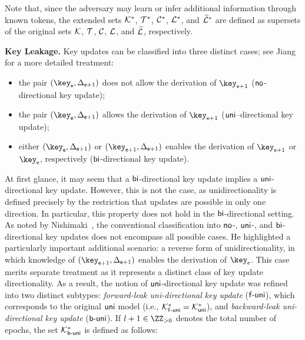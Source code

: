 \documentclass{fundam}
\begin{document}
Note that, since the adversary may learn or infer additional information through known tokens, the extended sets $\mathcal{K}^{*}$, $\mathcal{T}^{*}$, $\mathcal{C}^{*}$, $\mathcal{L}^{*}$, and $\widetilde{\mathcal{L}}^{*}$ are defined as supersets of the original sets $\mathcal{K}$, $\mathcal{T}$, $\mathcal{C}$, $\mathcal{L}$, and $\widetilde{\mathcal{L}}$, respectively.


\vspace{0.3cm}
\noindent\textbf{Key Leakage.} Key updates can be classified into three distinct cases; see Jiang~\cite{jiang2020} for a more detailed treatment:
\begin{itemize}
	\item the pair $(\key_{\epoch}, \tok_{\epoch+1})$ does not allow the derivation of $\key_{\epoch+1}$ ($\mathsf{no}$-directional key update);
	\item the pair $(\key_{\epoch}, \tok_{\epoch+1})$ allows the derivation of $\key_{\epoch+1}$ ($\mathsf{uni}$--directional key update);
	\item either $(\key_{\epoch}, \tok_{\epoch+1})$ or $(\key_{\epoch+1}, \tok_{\epoch+1})$ enables the derivation of $\key_{\epoch+1}$ or $\key_{\epoch}$, respectively ($\mathsf{bi}$-directional key update).
\end{itemize}



At first glance, it may seem that a $\mathsf{bi}$-directional key update implies a $\mathsf{uni}$-directional key update. However, this is not the case, as unidirectionality is defined precisely by the restriction that updates are possible in only one direction. In particular, this property does not hold in the $\mathsf{bi}$-directional setting.
%
As noted by Nishimaki~\cite{nishimaki2022direction}, the conventional classification into $\mathsf{no}$-, $\mathsf{uni}$-, and $\mathsf{bi}$-directional key updates does not encompass all possible cases. He highlighted a particularly important additional scenario: a reverse form of unidirectionality, in which knowledge of $(\key_{\epoch+1}, \tok_{\epoch+1})$ enables the derivation of $\key_{\epoch}$. This case merits separate treatment as it represents a distinct class of key update directionality. As a result, the notion of $\mathsf{uni}$-directional key update was refined into two distinct subtypes: \textit{forward-leak uni-directional key update} ($\mathsf{f}{\text{-}}\mathsf{uni}$), which corresponds to the original $\mathsf{uni}$ model (i.e., $\mathcal{K}_{\mathsf{f}{\text{-}}\mathsf{uni}}^{*} = \mathcal{K}_{\mathsf{uni}}^{*}$), and \textit{backward-leak uni-directional key update} ($\mathsf{b}{\text{-}}\mathsf{uni}$). If $l+1 \in \ZZ_{>0}$ denotes the total number of epochs, the set $\mathcal{K}_{\mathsf{b}{\text{-}}\mathsf{uni}}^{*}$ is defined as follows:
\end{document}
